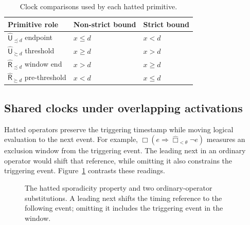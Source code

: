 \documentclass{ieeeaccess}
\newcommand{\hUntil}{\mathbin{\widehat{\mathsf{U}}}}
\newcommand{\hRelease}{\mathbin{\widehat{\mathsf{R}}}}
\begin{document}
\begin{table}[t]
\centering
\caption{Clock comparisons used by each hatted primitive.}
\label{tab:clock-tests}
\begin{tabular}{@{}lll@{}}
\toprule
Primitive role & Non-strict bound & Strict bound\\
\midrule
$\hUntil_{\precsim d}$ endpoint & $x\le d$ & $x<d$\\
$\hUntil_{\succsim d}$ threshold & $x\ge d$ & $x>d$\\
$\hRelease_{\precsim d}$ window end & $x>d$ & $x\ge d$\\
$\hRelease_{\succsim d}$ pre-threshold & $x<d$ & $x\le d$\\
\bottomrule
\end{tabular}
\end{table}

\subsection{Shared clocks under overlapping activations}
\label{subsec:overlap-motivation}
Hatted operators preserve the triggering timestamp while moving logical
evaluation to the next event. For example,
$\Box(e\Rightarrow\widehat{\Box}_{<\theta}\neg e)$ measures an exclusion
window from the triggering event. The leading next in an ordinary operator
would shift that reference, while omitting it also constrains the triggering
event. Figure~\ref{fig:hat-reference} contrasts these readings.
\begin{figure}[t]
\centering

\caption{The hatted sporadicity property and two ordinary-operator
substitutions. A leading next shifts the timing reference to the following
event; omitting it includes the triggering event in the window.}
\label{fig:hat-reference}
\end{figure}
\end{document}
